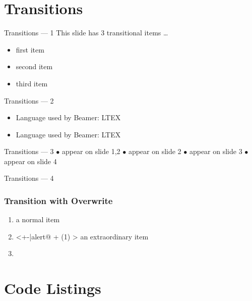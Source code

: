 \documentclass[pdf]{beamer}
\begin{document}
\section{Transitions}

\begin{frame}{Transitions --- 1}
  This slide has 3 transitional items \ldots
  \begin{itemize}
    \item<+-|alert@+> first item
    \item<+-|alert@+> second item
    \item<+-|alert@+> third item
  \end{itemize}
\end{frame}

\begin{frame}{Transitions --- 2}
  \begin{itemize}
    \item Language used by Beamer: LTEX
    \item Language used by Beamer: LTEX
  \end{itemize}
\end{frame}

\begin{frame}[t]{Transitions --- 3}
   {{\small\color{blue}$\bullet$} appear on slide 1,2 \newline}
   {{\small\color{blue}$\bullet$} appear on slide 2 \newline}
   {{\small\color{blue}$\bullet$} appear on slide 3 \newline}
   {{\small\color{blue}$\bullet$} appear on slide 4 \newline}
\end{frame}

\begin{frame}{Transitions --- 4}
  \frametitle{Transition with Overwrite}
  \begin{enumerate}
    \item<+-> {a normal item}
    \item<+-|alert@ + (1) > {an extraordinary item}
    \item[]
  \end{enumerate}
\end{frame}

\section{Code Listings}
\end{document}
